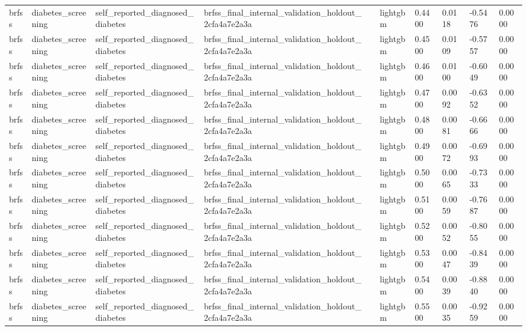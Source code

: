 \begin{tabular}{llllllllll}
brfss & diabetes\_screening & self\_reported\_diagnosed\_diabetes & brfss\_final\_internal\_validation\_holdout\_2cfa4a7e2a3a &  & lightgbm & 0.4400 & 0.0118 & -0.5476 & 0.0000 \\
brfss & diabetes\_screening & self\_reported\_diagnosed\_diabetes & brfss\_final\_internal\_validation\_holdout\_2cfa4a7e2a3a &  & lightgbm & 0.4500 & 0.0109 & -0.5757 & 0.0000 \\
brfss & diabetes\_screening & self\_reported\_diagnosed\_diabetes & brfss\_final\_internal\_validation\_holdout\_2cfa4a7e2a3a &  & lightgbm & 0.4600 & 0.0100 & -0.6049 & 0.0000 \\
brfss & diabetes\_screening & self\_reported\_diagnosed\_diabetes & brfss\_final\_internal\_validation\_holdout\_2cfa4a7e2a3a &  & lightgbm & 0.4700 & 0.0092 & -0.6352 & 0.0000 \\
brfss & diabetes\_screening & self\_reported\_diagnosed\_diabetes & brfss\_final\_internal\_validation\_holdout\_2cfa4a7e2a3a &  & lightgbm & 0.4800 & 0.0081 & -0.6666 & 0.0000 \\
brfss & diabetes\_screening & self\_reported\_diagnosed\_diabetes & brfss\_final\_internal\_validation\_holdout\_2cfa4a7e2a3a &  & lightgbm & 0.4900 & 0.0072 & -0.6993 & 0.0000 \\
brfss & diabetes\_screening & self\_reported\_diagnosed\_diabetes & brfss\_final\_internal\_validation\_holdout\_2cfa4a7e2a3a &  & lightgbm & 0.5000 & 0.0065 & -0.7333 & 0.0000 \\
brfss & diabetes\_screening & self\_reported\_diagnosed\_diabetes & brfss\_final\_internal\_validation\_holdout\_2cfa4a7e2a3a &  & lightgbm & 0.5100 & 0.0059 & -0.7687 & 0.0000 \\
brfss & diabetes\_screening & self\_reported\_diagnosed\_diabetes & brfss\_final\_internal\_validation\_holdout\_2cfa4a7e2a3a &  & lightgbm & 0.5200 & 0.0052 & -0.8055 & 0.0000 \\
brfss & diabetes\_screening & self\_reported\_diagnosed\_diabetes & brfss\_final\_internal\_validation\_holdout\_2cfa4a7e2a3a &  & lightgbm & 0.5300 & 0.0047 & -0.8439 & 0.0000 \\
brfss & diabetes\_screening & self\_reported\_diagnosed\_diabetes & brfss\_final\_internal\_validation\_holdout\_2cfa4a7e2a3a &  & lightgbm & 0.5400 & 0.0039 & -0.8840 & 0.0000 \\
brfss & diabetes\_screening & self\_reported\_diagnosed\_diabetes & brfss\_final\_internal\_validation\_holdout\_2cfa4a7e2a3a &  & lightgbm & 0.5500 & 0.0035 & -0.9259 & 0.0000 \\

\end{tabular}
